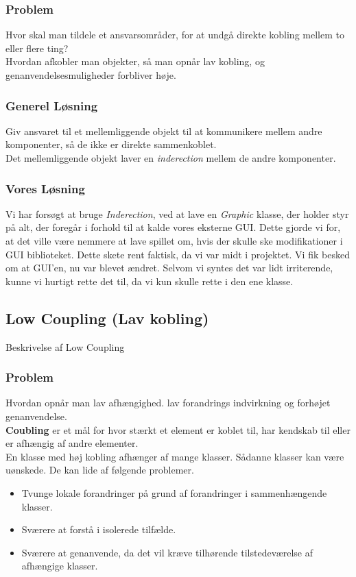 \subsubsection*{Problem}
Hvor skal man tildele et ansvarsområder, for at undgå direkte kobling mellem to eller flere ting?
\\
Hvordan afkobler man objekter, så man opnår lav kobling, og genanvendelsesmuligheder forbliver høje.
\subsubsection*{Generel Løsning}
Giv ansvaret til et mellemliggende objekt til at kommunikere mellem andre komponenter, så de ikke er direkte sammenkoblet.
\\
Det mellemliggende objekt laver en \textit{inderection} mellem de andre komponenter.
\subsubsection*{Vores Løsning}
Vi har forsøgt at bruge \textit{Inderection}, ved at lave en \textit{Graphic} klasse, der holder styr på alt, der foregår i forhold til at kalde vores eksterne GUI. Dette gjorde vi for, at det ville være nemmere at lave spillet om, hvis der skulle ske modifikationer i GUI biblioteket. Dette skete rent faktisk, da vi var midt i projektet. Vi fik besked om at GUI'en, nu var blevet ændret. Selvom vi syntes det var lidt irriterende, kunne vi hurtigt rette det til, da vi kun skulle rette i den ene klasse.
\subsection{Low Coupling (Lav kobling)}
Beskrivelse af Low Coupling
\subsubsection*{Problem}
Hvordan opnår man lav afhængighed. lav forandrings indvirkning og forhøjet genanvendelse.
\\
\textbf{Coubling} er et mål for hvor stærkt et element er koblet til, har kendskab til eller er afhængig af andre elementer.
\\
En klasse med høj kobling afhænger af mange klasser. Sådanne klasser kan være uønskede. De kan lide af følgende problemer.
\begin{itemize}
\item Tvunge lokale forandringer på grund af forandringer i sammenhængende klasser.
\item Sværere at forstå i isolerede tilfælde.
\item Sværere at genanvende, da det vil kræve tilhørende tilstedeværelse af afhængige klasser.
\end{itemize}
